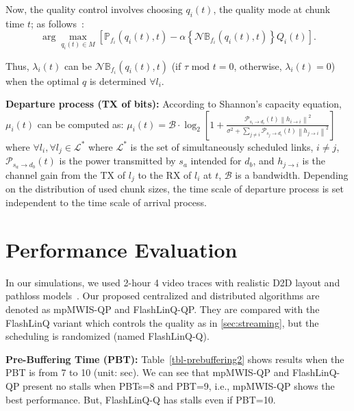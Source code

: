 \documentclass[journal]{IEEEtran}
\begin{document}
Now, the quality control involves choosing $q_{i}(t)$, the quality mode at chunk time $t$; as follows~\cite{asilomar2012bethanabhotla}:
\begin{equation}
\arg\max_{q_{i}(t)\in M}
\left[\mathbb{P}_{f_{i}}\left(q_{i}(t),t\right) -\alpha  \left\{\mathcal{N}\mathbb{B}_{f_{i}}(q_{i}(t), t)\right\} Q_{i}(t)\right].
\label{eq:final2}
\end{equation}

Thus,
$\lambda_{i}(t)$ can be $\mathcal{N}\mathbb{B}_{f_{i}}(q_{i}(t), t)$ (if $\tau \text{ mod } t = 0$, otherwise, $\lambda_{i}(t) = 0$) when the optimal $q$ is determined $\forall l_{i}$.


\textbf{Departure process (TX of bits):}
According to Shannon's capacity equation, $\mu_{i}(t)$ can be computed as:
$
\mu_{i}(t) = \mathcal{B}\cdot\log_{2}\left[1+\frac{\mathcal{P}_{s_{i}\rightarrow d_{i}}(t)\left\|h_{i\rightarrow i}\right\|^{2}}{\sigma^{2}+\sum_{j\neq i}
 \mathcal{P}_{s_{j}\rightarrow d_{i}}(t)\left\|h_{j\rightarrow i}\right\|^{2}}\right]
 \label{eq:dept}
$
where $\forall l_{i}, \forall l_{j} \in \mathcal{L}^{*}$ where $\mathcal{L}^{*}$ is the set of simultaneously scheduled links, $i\neq j$,
$\mathcal{P}_{s_{a}\rightarrow d_{b}}(t)$ is the power transmitted by $s_{a}$ intended for $d_{b}$, and $h_{j\rightarrow i}$ is the channel gain from the TX of $l_{j}$ to the RX of $l_{i}$ at $t$,
$\mathcal{B}$ is a bandwidth.
Depending on the distribution of used chunk sizes, the time scale of departure process is set independent to the time scale of arrival process.

\vspace{-1.0mm}
\section{Performance Evaluation}\label{sec:simulation}
In our simulations, we used 2-hour 4 video traces with realistic D2D layout and pathloss models~\cite{jsac2014ji}.
Our proposed centralized and distributed algorithms are denoted as mpMWIS-QP and FlashLinQ-QP.
They are compared with the FlashLinQ variant which controls the quality as in \textsection\ref{sec:streaming}, but the scheduling is randomized (named FlashLinQ-Q).

\textbf{Pre-Buffering Time (PBT):}
Table~\ref{tbl-prebuffering2} shows results when the PBT is from 7 to 10 (unit: sec).
We can see that mpMWIS-QP and FlashLinQ-QP present no stalls when PBTs=8 and PBT=9, i.e., mpMWIS-QP shows the best performance.
But, FlashLinQ-Q has stalls even if PBT=10.
\end{document}
